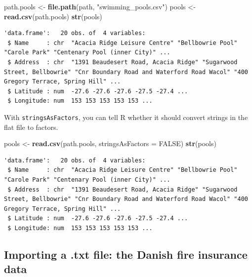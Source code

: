 \documentclass[
]{book}
\newenvironment{Shaded}{\begin{snugshade}}{\end{snugshade}}
\newcommand{\DataTypeTok}[1]{\textcolor[rgb]{0.13,0.29,0.53}{#1}}
\newcommand{\KeywordTok}[1]{\textcolor[rgb]{0.13,0.29,0.53}{\textbf{#1}}}
\newcommand{\NormalTok}[1]{#1}
\newcommand{\OtherTok}[1]{\textcolor[rgb]{0.56,0.35,0.01}{#1}}
\newcommand{\StringTok}[1]{\textcolor[rgb]{0.31,0.60,0.02}{#1}}
\begin{document}
\begin{Shaded}
\begin{Highlighting}[]
\NormalTok{path.pools <-}\StringTok{ }\KeywordTok{file.path}\NormalTok{(path, }\StringTok{"swimming_pools.csv"}\NormalTok{)}
\NormalTok{pools <-}\StringTok{ }\KeywordTok{read.csv}\NormalTok{(path.pools)}
\KeywordTok{str}\NormalTok{(pools)}
\end{Highlighting}
\end{Shaded}

\begin{verbatim}
'data.frame':	20 obs. of  4 variables:
 $ Name     : chr  "Acacia Ridge Leisure Centre" "Bellbowrie Pool" "Carole Park" "Centenary Pool (inner City)" ...
 $ Address  : chr  "1391 Beaudesert Road, Acacia Ridge" "Sugarwood Street, Bellbowrie" "Cnr Boundary Road and Waterford Road Wacol" "400 Gregory Terrace, Spring Hill" ...
 $ Latitude : num  -27.6 -27.6 -27.6 -27.5 -27.4 ...
 $ Longitude: num  153 153 153 153 153 ...
\end{verbatim}

With \texttt{stringsAsFactors}, you can tell R whether it should convert strings in the flat file to factors.

\begin{Shaded}
\begin{Highlighting}[]
\NormalTok{pools <-}\StringTok{ }\KeywordTok{read.csv}\NormalTok{(path.pools, }\DataTypeTok{stringsAsFactors =} \OtherTok{FALSE}\NormalTok{)}
\KeywordTok{str}\NormalTok{(pools)}
\end{Highlighting}
\end{Shaded}

\begin{verbatim}
'data.frame':	20 obs. of  4 variables:
 $ Name     : chr  "Acacia Ridge Leisure Centre" "Bellbowrie Pool" "Carole Park" "Centenary Pool (inner City)" ...
 $ Address  : chr  "1391 Beaudesert Road, Acacia Ridge" "Sugarwood Street, Bellbowrie" "Cnr Boundary Road and Waterford Road Wacol" "400 Gregory Terrace, Spring Hill" ...
 $ Latitude : num  -27.6 -27.6 -27.6 -27.5 -27.4 ...
 $ Longitude: num  153 153 153 153 153 ...
\end{verbatim}

\hypertarget{importing-a-.txt-file-the-danish-fire-insurance-data}{%
\subsection{Importing a .txt file: the Danish fire insurance data}\label{importing-a-.txt-file-the-danish-fire-insurance-data}}
\end{document}

